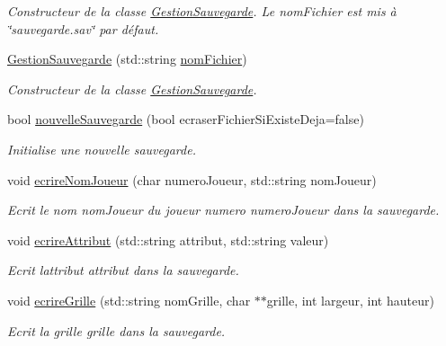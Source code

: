\begin{DoxyCompactItemize}
\begin{DoxyCompactList}\small\item\em Constructeur de la classe \hyperlink{class_gestion_sauvegarde}{Gestion\+Sauvegarde}. Le nom\+Fichier est mis à \char`\"{}sauvegarde.\+sav\char`\"{} par défaut. \end{DoxyCompactList}\item 
\hyperlink{class_gestion_sauvegarde_a8747ad1458ee812251fdc01a2d7cdf31}{Gestion\+Sauvegarde} (std\+::string \hyperlink{class_gestion_sauvegarde_afda944907acb4f5660cda5a893a8fb66}{nom\+Fichier})
\begin{DoxyCompactList}\small\item\em Constructeur de la classe \hyperlink{class_gestion_sauvegarde}{Gestion\+Sauvegarde}. \end{DoxyCompactList}\item 
bool \hyperlink{class_gestion_sauvegarde_a90368ce1ddf00e71d70210255fcb7b9e}{nouvelle\+Sauvegarde} (bool ecraser\+Fichier\+Si\+Existe\+Deja=false)
\begin{DoxyCompactList}\small\item\em Initialise une nouvelle sauvegarde. \end{DoxyCompactList}\item 
void \hyperlink{class_gestion_sauvegarde_a018fd16bf08ea7bb861efcb0ef056a02}{ecrire\+Nom\+Joueur} (char numero\+Joueur, std\+::string nom\+Joueur)
\begin{DoxyCompactList}\small\item\em Ecrit le nom {\ttfamily nom\+Joueur} du joueur numero {\ttfamily numero\+Joueur} dans la sauvegarde. \end{DoxyCompactList}\item 
void \hyperlink{class_gestion_sauvegarde_a68cf7cf6c6f40297175107adcc7e2409}{ecrire\+Attribut} (std\+::string attribut, std\+::string valeur)
\begin{DoxyCompactList}\small\item\em Ecrit l\textquotesingle{}attribut {\ttfamily attribut} dans la sauvegarde. \end{DoxyCompactList}\item 
void \hyperlink{class_gestion_sauvegarde_a70dae5214cefc18c7954fea885f45822}{ecrire\+Grille} (std\+::string nom\+Grille, char $\ast$$\ast$grille, int largeur, int hauteur)
\begin{DoxyCompactList}\small\item\em Ecrit la grille {\ttfamily grille} dans la sauvegarde. \end{DoxyCompactList}\item 
$$
\end{DoxyCompactItemize}
